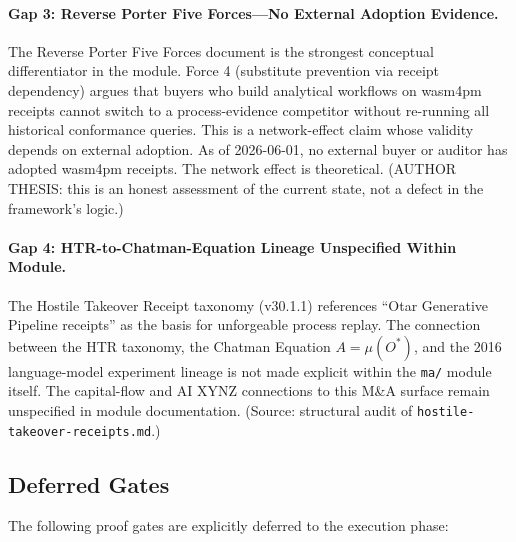 \paragraph{Gap 3: Reverse Porter Five Forces---No External Adoption Evidence.}
The Reverse Porter Five Forces document is the strongest conceptual differentiator in the
module. Force 4 (substitute prevention via receipt dependency) argues that buyers who build
analytical workflows on wasm4pm receipts cannot switch to a process-evidence competitor
without re-running all historical conformance queries. This is a network-effect claim whose
validity depends on external adoption. As of 2026-06-01, no external buyer or auditor has
adopted wasm4pm receipts. The network effect is theoretical. (AUTHOR THESIS: this is an
honest assessment of the current state, not a defect in the framework's logic.)

\paragraph{Gap 4: HTR-to-Chatman-Equation Lineage Unspecified Within Module.}
The Hostile Takeover Receipt taxonomy (v30.1.1) references ``Otar Generative Pipeline
receipts'' as the basis for unforgeable process replay. The connection between the HTR
taxonomy, the Chatman Equation $A = \mu(O^*)$, and the 2016 language-model experiment
lineage is not made explicit within the \texttt{ma/} module itself. The capital-flow and
AI XYNZ connections to this M\&A surface remain unspecified in module documentation.
(Source: structural audit of \texttt{hostile-takeover-receipts.md}.)

\subsection{Deferred Gates}
\label{sec:ma-gaps-deferred}

The following proof gates are explicitly deferred to the execution phase:

